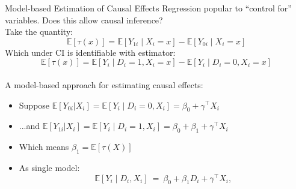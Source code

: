 \documentclass[xcolor=dvipsnames]{beamer}
\newcommand\E{\mathbb{E}}
\begin{document}
\begin{frame}{Model-based Estimation of Causal Effects}
\small
{} Regression popular to ``control for'' variables. Does this allow causal inference? \\
\medskip
{} Take the quantity: \\
\[\E[\tau(x)] = \E[Y_{1i} \mid X_i=x] - \E[Y_{0i} \mid X_i=x] \]
 Which under CI is identifiable with estimator:
\[ \E[\tau(x)] = \E[Y_i\mid D_i=1, X_i=x] - \E[Y_i\mid D_i=0, X_i=x] \] \\


 A \alert{model-based} approach for estimating causal effects:
\footnotesize
\begin{itemize}
\item<6-> Suppose $\E[Y_{0i}|X_i]=\E[Y_i \mid D_i=0, X_i]=\beta_0+\gamma^{\top}X_i$
\item<7-> ...and $\E[Y_{1i}|X_i]=\E[Y_i \mid D_i=1, X_i]=\beta_0+\beta_1+\gamma^{\top}X_i$
\item<8-> Which means $\beta_1= \E[\tau(X)]$ 
\item<9-> As single model: 
$$ \E[Y_i\mid D_i, X_i] \ = \ \beta_0 + \beta_1D_i + \gamma^\top X_i, $$
\end{itemize}
\end{frame}
\end{document}
